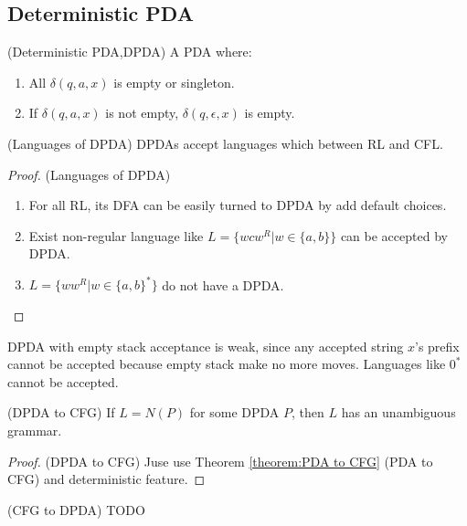        \subsection{Deterministic PDA}
        \begin{definition}
            (Deterministic PDA,DPDA) A PDA where:
            \begin{enumerate}
                \item All $\delta(q,a,x)$ is empty or singleton.
                \item If $\delta(q,a,x)$ is not empty, $\delta(q,\epsilon,x)$ is empty.
            \end{enumerate}
        \end{definition}
        \begin{theorem}
            (Languages of DPDA) DPDAs accept languages which between RL and CFL.
        \end{theorem}
        \begin{proof}
            (Languages of DPDA) 
            \begin{enumerate}
                \item For all RL, its DFA can be easily turned to DPDA by add default choices.
                \item Exist non-regular language like $L=\{wcw^{R}|w\in \{a,b\}\}$ can be accepted by DPDA.
                \item $L=\{ww^{R}|w\in  \{a,b\}^{*}\}$ do not have a DPDA.
            \end{enumerate}
        \end{proof}
            DPDA with empty stack acceptance is weak, since any accepted string $x$'s prefix cannot be accepted because empty stack make no more moves. Languages like $0^{*}$ cannot be accepted.
        \begin{theorem}
            (DPDA to CFG) If $L=N(P)$ for some DPDA $P$, then $L$ has an unambiguous grammar.
        \end{theorem}
        \begin{proof}
            (DPDA to CFG) Juse use Theorem \ref{theorem:PDA to CFG} (PDA to CFG) and deterministic feature.
        \end{proof}
        \begin{theorem}
            (CFG to DPDA) TODO
        \end{theorem}

